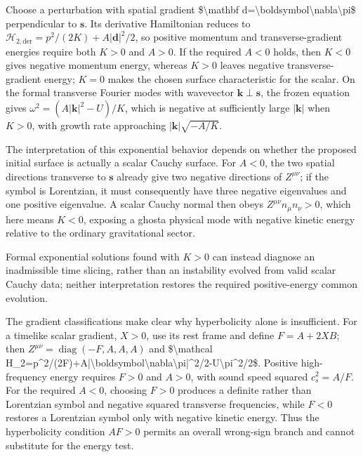 \documentclass[11pt]{article}
\begin{document}
Choose a perturbation with spatial gradient \$\textbackslash{}mathbf d=\textbackslash{}boldsymbol\textbackslash{}nabla\textbackslash{}pi\$ perpendicular to $\mathbf s$. Its derivative Hamiltonian reduces to $\mathcal H_{2,\mathrm{der}}=p^2/(2K)+A|\mathbf d|^2/2$, so positive momentum and transverse-gradient energies require both $K>0$ and $A>0$. If the required $A<0$ holds, then $K<0$ gives negative momentum energy, whereas $K>0$ leaves negative transverse-gradient energy; $K=0$ makes the chosen surface characteristic for the scalar. On the formal transverse Fourier modes with wavevector $\mathbf k\perp\mathbf s$, the frozen equation gives $\omega^2=(A|\mathbf k|^2-U)/K$, which is negative at sufficiently large $|\mathbf k|$ when $K>0$, with growth rate approaching $|\mathbf k|\sqrt{-A/K}$.

The interpretation of this exponential behavior depends on whether the proposed initial surface is actually a scalar Cauchy surface. For $A<0$, the two spatial directions transverse to $\mathbf s$ already give two negative directions of $Z^{\mu\nu}$; if the symbol is Lorentzian, it must consequently have three negative eigenvalues and one positive eigenvalue. A scalar Cauchy normal then obeys $Z^{\mu\nu}n_\mu n_\nu>0$, which here means $K<0$, exposing a ghost\textemdash{}a physical mode with negative kinetic energy relative to the ordinary gravitational sector.

Formal exponential solutions found with $K>0$ can instead diagnose an inadmissible time slicing, rather than an instability evolved from valid scalar Cauchy data; neither interpretation restores the required positive-energy common evolution.

The gradient classifications make clear why hyperbolicity alone is insufficient. For a timelike scalar gradient, $X>0$, use its rest frame and define $F=A+2XB$; then $Z^{\mu\nu}=\operatorname{diag}(-F,A,A,A)$ and \$\textbackslash{}mathcal H\_2=p\textasciicircum{}2/(2F)+A|\textbackslash{}boldsymbol\textbackslash{}nabla\textbackslash{}pi|\textasciicircum{}2/2-U\textbackslash{}pi\textasciicircum{}2/2\$. Positive high-frequency energy requires $F>0$ and $A>0$, with sound speed squared $c_s^2=A/F$. For the required $A<0$, choosing $F>0$ produces a definite rather than Lorentzian symbol and negative squared transverse frequencies, while $F<0$ restores a Lorentzian symbol only with negative kinetic energy. Thus the hyperbolicity condition $AF>0$ permits an overall wrong-sign branch and cannot substitute for the energy test.
\end{document}
